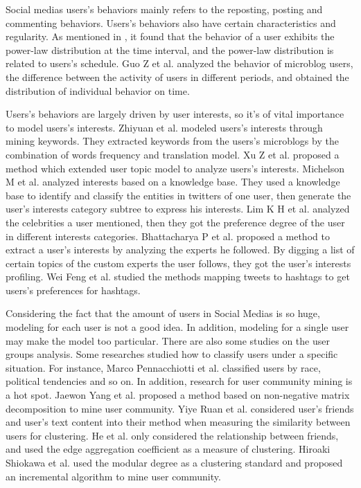 Social medias users's behaviors mainly refers to the reposting, posting and commenting behaviors. Users's behaviors also have certain characteristics and regularity. As mentioned in \cite{IEEEexample:jiang2013understanding}, it found that the behavior of a user exhibits the power-law distribution at the time interval, and the power-law distribution is related to users's schedule. Guo Z et al.\cite{IEEEexample:conf/music/GuoLTL12} analyzed the behavior of microblog users, the difference between the activity of users in different periods, and obtained the distribution of individual behavior on time.\par
Users's behaviors are largely driven by user interests, so it's of vital importance to model users's interests. Zhiyuan et al.\cite{IEEEexample:journals/fcsc/LiuCS12} modeled users's interests through mining keywords. They extracted keywords from the users's microblogs by the combination of words frequency and translation model. Xu Z et al.\cite{IEEEexample:conf/webi/XuLXY11} proposed a method which extended user topic model to analyze users's interests. Michelson M et al.\cite{IEEEexample:conf/and/MichelsonM10} analyzed interests  based on a knowledge base. They used a knowledge base to identify and classify the entities in twitters of one user, then generate the user's interests category subtree to express his interests. Lim K H et al.\cite{IEEEexample:conf/wikis/LimD13} analyzed the celebrities a user mentioned, then they got the preference degree of the user in different interests categories. Bhattacharya P et al.\cite{IEEEexample:conf/recsys/BhattacharyaZGGG14} proposed a method to extract a user's interests by analyzing the experts he followed. By digging a list of certain topics of the custom experts the user follows, they got the user's interests profiling. Wei Feng et al.\cite{IEEEexample:conf/icde/FengW14} studied the methods mapping tweets to hashtags to get users's preferences for hashtags.\par

Considering the fact that the amount of users in Social Medias is so huge, modeling for each user is not a good idea. In addition, modeling for a single user may make the model too particular. There are also some studies on the user groups analysis. Some researches studied how to classify users under a specific situation. For instance, Marco Pennacchiotti et al.\cite{IEEEexample:conf/icwsm/PennacchiottiP11} classified users by race, political tendencies and so on. In addition, research for user community mining is a hot spot. Jaewon Yang et al.\cite{IEEEexample:conf/wsdm/YangL13} proposed a method based on non-negative matrix decomposition to mine user community. Yiye Ruan et al.\cite{IEEEexample:conf/www/RuanFP13} considered user's friends and user's text content into their method when measuring the similarity between users for clustering. He et al. \cite{IEEEexample:he2014overlapping}
only considered the relationship between friends, and used the edge aggregation coefficient as a measure of clustering. Hiroaki Shiokawa et al.\cite{IEEEexample:conf/aaai/ShiokawaFO13} used the modular degree as a clustering standard and proposed an incremental algorithm to mine user community.\par

